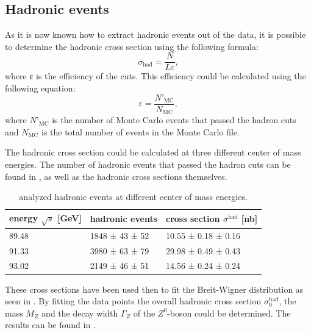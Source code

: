 \documentclass[epj,nopacs]{svjour}
\begin{document}
\subsection{Hadronic events}
As it is now known how to extract hadronic events out of the data, it is
possible to determine the hadronic cross section using the following formula:
\begin{equation}
σ_{\mathrm{had}} = \frac{N}{Lε},
\end{equation}
where ε is the efficiency of the cuts. This efficiency could be calculated
using the following equation:
\begin{equation}
ε = \frac{N’_{\mathrm{MC}}}{N_{\mathrm{MC}}},
\end{equation}
where $N’_{\mathrm{MC}}$ is the number of Monte Carlo events that passed the
hadron cuts and $N_{\mathrm{MC}}$ is the total number of events in the Monte
Carlo file.

The hadronic cross section could be calculated at three different center of
mass energies. The number of hadronic events that passed the hadron cuts can be
found in , as well as the hadronic cross sections themselves.

\begin{table}[h]
\begin{center}
\begin{tabular}{|l|l|l|}
\hline
energy $\sqrt{s}$ [\si{\GeV}] & hadronic events & cross section
$σ^{\mathrm{had}}$ [\si{\nano\barn}]\\
\hline
89.48 & 1848 ± 43 ± 52 & 10.55 ± 0.18 ± 0.16 \\
91.33 & 3980 ± 63 ± 79 & 29.98 ± 0.49 ± 0.43 \\
93.02 & 2149 ± 46 ± 51 & 14.56 ± 0.24 ± 0.24 \\
\hline
\end{tabular}
\vspace*{0.3cm}
\caption{\baselineskip=0.38cm analyzed hadronic events at different center of mass energies.}
\label{tab:hadr_events}
\end{center}
\vspace*{-0.5cm}
\end{table}

These cross sections have been used then to fit the Breit-Wigner distribution as
seen in .
By fitting the data
points the overall hadronic cross section $σ_0^{\mathrm{had}}$, the mass $M_Z$
and the decay width $Γ_Z$ of the $Z^0$-boson could be determined. The results
can be found in .
\end{document}
